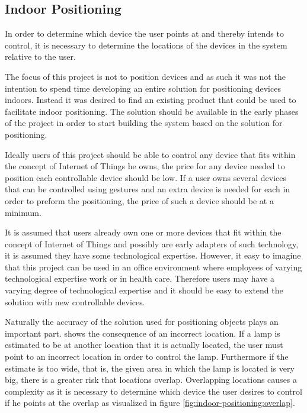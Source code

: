 \subsection{Indoor Positioning}\label{sec:indoor-positioning}

In order to determine which device the user points at and thereby intends to control, 
it is necessary to determine the locations of the devices in the system relative to the user.

The focus of this project is not to position devices and as such it was not the intention to spend time developing an entire solution for positioning devices indoors. 
Instead it was desired to find an existing product that could be used to facilitate indoor positioning.
The solution should be available in the early phases of the project in order to start building the system based on the solution for positioning.

Ideally users of this project should be able to control any device that fits within the concept of Internet of Things he owns, 
the price for any device needed to position each controllable device should be low. 
If a user owns several devices that can be controlled using gestures and an extra device is needed for each in order to preform the positioning, 
the price of such a device should be at a minimum.

It is assumed that users already own one or more devices that fit within the concept of Internet of Things and possibly are early adapters of such technology, 
it is assumed they have some technological expertise. 
However, it easy to imagine that this project can be used in an office environment where employees of varying technological expertise work or in health care. 
Therefore users may have a varying degree of technological expertise and it should be easy to extend the solution with new controllable devices.

Naturally the accuracy of the solution used for positioning objects plays an important part. 
 shows the consequence of an incorrect location. 
If a lamp is estimated to be at another location that it is actually located, 
the user must point to an incorrect location in order to control the lamp.
Furthermore if the estimate is too wide, that is, the given area in which the lamp is located is very big, 
there is a greater risk that locations overlap. 
Overlapping locations causes a complexity as it is necessary to determine which device the user desires to control if he points at the overlap as visualized in figure \ref{fig:indoor-positioning:overlap}.

